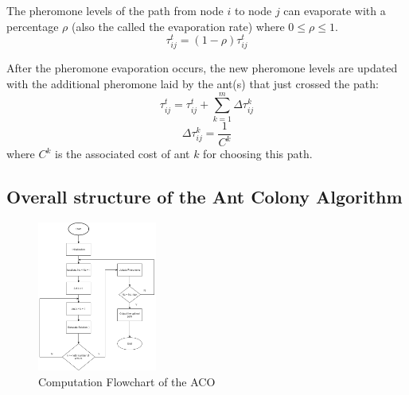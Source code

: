 \documentclass[conference]{IEEEtran}
\begin{document}
The pheromone levels of the path from node $i$ to node $j$ can evaporate with a percentage $\rho$ (also the called the evaporation rate) where $0 \leq \rho \leq 1$.
\begin{equation}
    \tau_{ij}^{t} = (1 - \rho) \tau_{ij}^{t}
\end{equation}

After the pheromone evaporation occurs, the new pheromone levels are updated with the additional pheromone laid by the ant(s) that just crossed the path:
\begin{equation}
    \tau_{ij}^{t} = \tau_{ij}^{t} + \sum_{k=1}^{m}\Delta \tau_{ij}^{k}
\end{equation}
\begin{equation}
    \Delta \tau_{ij}^{k} = \frac{1}{C^{k}}
\end{equation}
where $C^{k}$ is the associated cost of ant $k$ for choosing this path.
\subsection{Overall structure of the Ant Colony Algorithm}
\begin{figure}[H]
    \centering
    \includegraphics[width=0.35\textwidth]{ACO.png}
    \caption{Computation Flowchart of the ACO}
    \label{fig3}
\end{figure}
\end{document}
